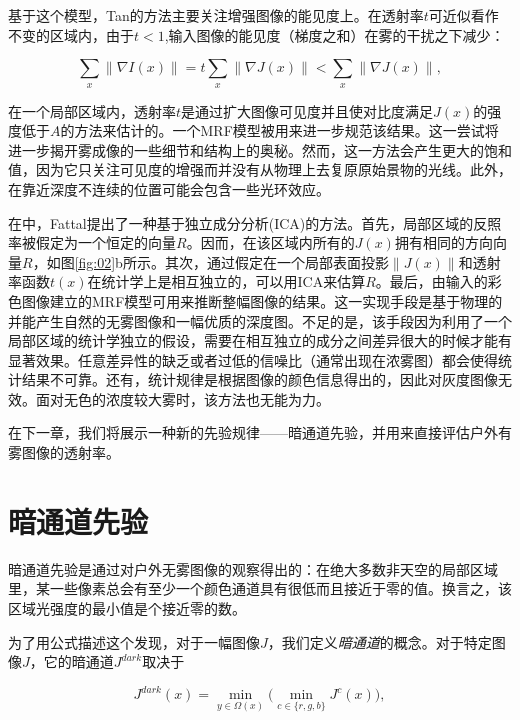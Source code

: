 \documentclass{ctexart}
\begin{document}
基于这个模型，Tan的方法\cite{Tan2008}主要关注增强图像的能见度上。在透射率$t$可近似看作不变的区域内，由于$t<1$,输入图像的能见度（梯度之和）在雾的干扰之下减少：

\begin{equation}\label{equ:4}
    \sum_x \| \nabla I(x) \| = t \sum_x \| \nabla J(x) \| < \sum_x \| \nabla J(x) \|,
\end{equation}

在一个局部区域内，透射率$t$是通过扩大图像可见度并且使对比度满足$J(x)$的强度低于$A$的方法来估计的。一个MRF模型被用来进一步规范该结果。这一尝试将进一步揭开雾成像的一些细节和结构上的奥秘。然而，这一方法会产生更大的饱和值，因为它只关注可见度的增强而并没有从物理上去复原原始景物的光线。此外，在靠近深度不连续的位置可能会包含一些光环效应。\par

在\cite{Fattal2008}中，Fattal提出了一种基于独立成分分析(ICA)的方法。首先，局部区域的反照率被假定为一个恒定的向量$R$。因而，在该区域内所有的$J(x)$拥有相同的方向向量$R$，如图\ref{fig:02}b所示。其次，通过假定在一个局部表面投影$\|J(x)\|$和透射率函数$t(x)$在统计学上是相互独立的，可以用ICA来估算$R$。最后，由输入的彩色图像建立的MRF模型可用来推断整幅图像的结果。这一实现手段是基于物理的并能产生自然的无雾图像和一幅优质的深度图。不足的是，该手段因为利用了一个局部区域的统计学独立的假设，需要在相互独立的成分之间差异很大的时候才能有显著效果。任意差异性的缺乏或者过低的信噪比（通常出现在浓雾图）都会使得统计结果不可靠。还有，统计规律是根据图像的颜色信息得出的，因此对灰度图像无效。面对无色的浓度较大雾时，该方法也无能为力。\par

在下一章，我们将展示一种新的先验规律——暗通道先验，并用来直接评估户外有雾图像的透射率。\par

\section{暗通道先验}
暗通道先验是通过对户外无雾图像的观察得出的：在绝大多数非天空的局部区域里，某一些像素总会有至少一个颜色通道具有很低而且接近于零的值。换言之，该区域光强度的最小值是个接近零的数。\par

为了用公式描述这个发现，对于一幅图像$J$，我们定义\emph{暗通道}的概念。对于特定图像$J$，它的暗通道$J^{dark}$取决于

\begin{equation}\label{equ:5}
    J^{dark}(x) = \min_{y \in \Omega(x)}\Big(\min_{c \in \{ r, g, b\}} J^c(x)\Big),
\end{equation}
\end{document}
